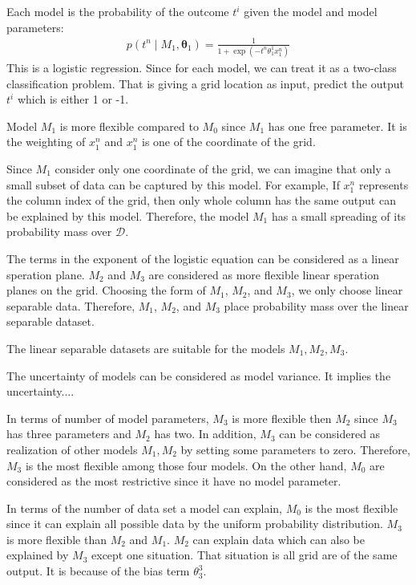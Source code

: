 \documentclass[12pt]{article}
\newenvironment{question}[2][Question]{\begin{trivlist}
\kern10pt
\item[\hskip \labelsep {\bfseries #1}\hskip \labelsep {\bfseries #2.}]}{\end{trivlist}}
\begin{document}
\begin{question}{18}
Each model is the probability of the outcome $t^i$ given the model and model
parameters:
\begin{align*}
  p(t^n\mid M_1, \bm{\theta}_1) = \frac{1}{1 + \exp(-t^n\theta^1_1 x^n_1)}
\end{align*}
This is a logistic regression. Since for each model, we can treat it as a 
two-class classification problem. That is giving a grid location as input, 
predict the output $t^i$ which is either 1 or -1.

Model $M_1$ is more flexible compared to $M_0$ since $M_1$ has one 
free parameter. It is the weighting of $x^n_1$ and $x^n_1$ is one of the coordinate
of the grid.

Since $M_1$ consider only one coordinate of the grid, we can imagine that only a 
small subset of data can be captured by this model. 
For example, If $x^n_1$ represents the column index of the grid, then only whole
column has the same output can be explained by this model.
Therefore, the model $M_1$ has a small spreading of its probability mass over 
$\mathcal{D}$.
\end{question}

\begin{question}{19}
The terms in the exponent of the logistic equation can be considered as 
a linear speration plane.
$M_2$ and $M_3$ are considered as more flexible linear speration planes on the grid.
Choosing the form of $M_1$, $M_2$, and $M_3$, we only choose linear separable data.
Therefore, $M_1$, $M_2$, and $M_3$ place probability mass over the linear separable
dataset.

The linear separable datasets are suitable for the models $M_1, M_2, M_3$.

The uncertainty of models can be considered as model variance. 
It implies the uncertainty....%

In terms of number of model parameters, $M_3$ is more flexible then $M_2$ since
$M_3$ has three parameters and $M_2$ has two.
In addition, $M_3$ can be considered as realization of other models 
${M_1, M_2}$ by setting some parameters to zero.
Therefore, $M_3$ is the most flexible among those four models.
On the other hand, $M_0$ are considered as the most restrictive since
it have no model parameter.

In terms of the number of data set a model can explain, $M_0$ is the most
flexible since it can explain all possible data by the uniform probability 
distribution.
$M_3$ is more flexible than $M_2$ and $M_1$. $M_2$ can explain data which can 
also be explained by $M_3$ except one situation. That situation is all
grid are of the same output. It is because of the bias term $\theta^3_3$.
\end{question}
\end{document}
